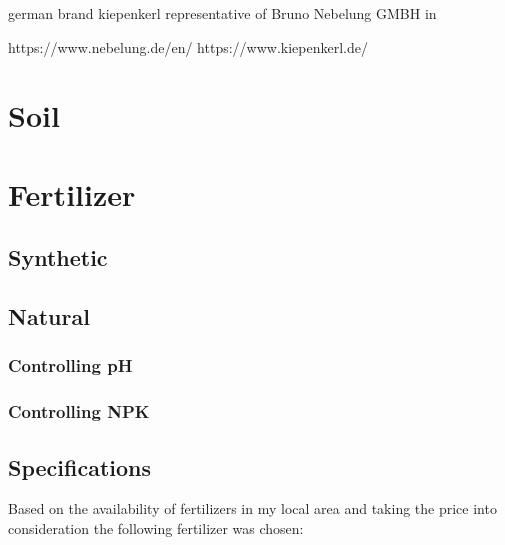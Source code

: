 \documentclass[a4paper,12pt]{article}
\begin{document}
german brand kiepenkerl representative of Bruno Nebelung GMBH in 



https://www.nebelung.de/en/
https://www.kiepenkerl.de/

\section{Soil}

\section{Fertilizer}
\subsection{Synthetic}
\subsection{Natural}
\subsubsection{Controlling pH}
\subsubsection{Controlling NPK}
\subsection{Specifications}
Based on the availability of fertilizers in my local area and taking the price into consideration the following fertilizer was chosen:











\printbibliography
\end{document}
